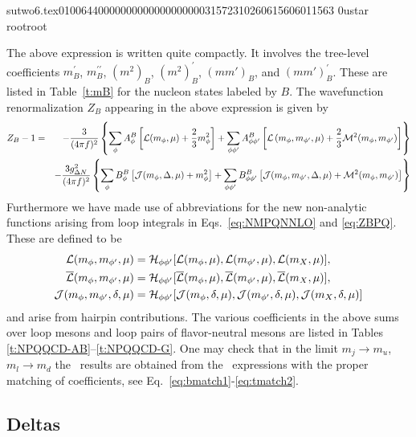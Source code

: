                                                                                                                                                                                                                                                                                       sutwo6.tex                                                                                          0100644 0000000 0000000 00000315723 10260615606 011563  0                                                                                                    ustar   root                            root                                                                                                                                                                                                                   \documentclass[prd,amssymb,amsmath,showpacs,nofootinbib,superscriptaddress]{revtex4}
\begin{document}
The above expression is written quite compactly. It involves the 
tree-level coefficients $m_B^\prime$, $m_B^{\prime \prime}$, $(m^2)_B$, $(m^2)_B^\prime$, $(mm')_B$, 
and $(mm')_B^\prime$. These are listed in Table~\ref{t:mB} for the nucleon states labeled by $B$.  
The wavefunction renormalization $Z_B$ appearing in the above expression
is given by
{\small
\begin{eqnarray}
Z_B - 1 
&=& 
   - \frac{3}{(4 \pi f )^2}
\left\{ 
\sum_\phi A^B_\phi 
\left[  {\mathcal L}(m_\phi , \mu) + \frac{2}{3} m_\phi^2 \right]
+
\sum_{\phi \phi'} A^B_{\phi \phi'}
\left[
{\mathcal L} \left( m_\phi, m_{\phi'},\mu  \right)
+
\frac{2}{3} \mathcal{M}^2(m_\phi, m_{\phi'})
\right]
\right\}
\notag \\
&&- 
\frac{3 g_{{\Delta} N}^2}{(4 \pi f)^2 } 
\left\{ 
\sum_\phi B^B_\phi \left[ {\mathcal J}(m_\phi, {\Delta}, \mu) + m_\phi^2 \right]
+
\sum_{\phi \phi'} B^B_{\phi \phi'} 
\left[
{\mathcal J}(m_\phi,m_{\phi'},{\Delta},\mu)
+
\mathcal{M}^2(m_\phi, m_{\phi'})
\right]
\right\} 
\notag \\
\label{eq:ZBPQ} \end{eqnarray}
}
Furthermore we have made use of abbreviations for the new non-analytic 
functions arising from loop integrals in Eqs.~\eqref{eq:NMPQNNLO} and
\eqref{eq:ZBPQ}. These are defined to be
\begin{align}
{\mathcal L}(m_\phi,m_{\phi'},\mu) &= {\mathcal H}_{\phi\phi'}
[ {\mathcal L}(m_\phi,\mu),{\mathcal L}(m_{\phi'}, \mu), {\mathcal L}(m_X,\mu)], \notag \\   
{\overline{{\mathcal L}}}(m_\phi,m_{\phi'},\mu) &= {\mathcal H}_{\phi\phi'}
[ {\overline{{\mathcal L}}}(m_\phi,\mu), {\overline{{\mathcal L}}}(m_{\phi'}, \mu), {\overline{{\mathcal L}}}(m_X,\mu)], \notag \\ 
{\mathcal J}(m_\phi,m_{\phi'},{\delta},\mu) &= {\mathcal H}_{\phi\phi'} 
[{\mathcal J}(m_\phi,{\delta},\mu),{\mathcal J}(m_{\phi'},{\delta},\mu),{\mathcal J}(m_X,{\delta},\mu) ]
\label{hairpin} \end{align}
and arise from hairpin contributions. 
The various coefficients in the above sums over loop mesons and loop pairs of flavor-neutral mesons 
are listed in Tables \ref{t:NPQQCD-AB}--\ref{t:NPQQCD-G}. 
One may check that in the limit $m_j \to m_u$, $m_l \to m_d$ the \CPT\ results are obtained from 
the \PQCPT\ expressions with the proper matching of coefficients, see
Eq.~\eqref{eq:bmatch1}-\eqref{eq:tmatch2}.


%
%
%
%
%
%
%
%
%
%
%
%
\subsection{Deltas}
\end{document}
